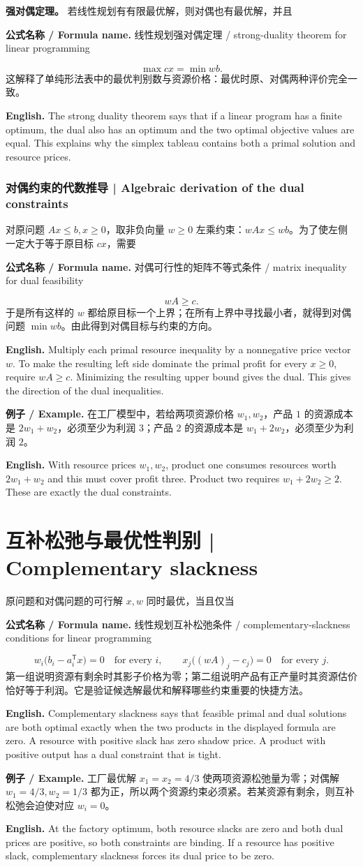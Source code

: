 \documentclass[UTF8,11pt,a4paper]{ctexart}
\newcommand{\EN}[1]{\par\noindent \textbf{English.} #1\par}
\newcommand{\FORMULA}[2]{\par\noindent\textbf{公式名称 / Formula name.} #1 / #2\par}
\newcommand{\EX}[2]{\par\noindent \textbf{例子 / Example.} #1\par\EN{#2}}
\begin{document}
\noindent\textbf{强对偶定理。} 若线性规划有有限最优解，则对偶也有最优解，并且
\FORMULA{线性规划强对偶定理}{strong-duality theorem for linear programming}
\[
\max cx=\min wb.
\]
这解释了单纯形法表中的最优判别数与资源价格：最优时原、对偶两种评价完全一致。
\EN{The strong duality theorem says that if a linear program has a finite optimum, the dual also has an optimum and the two optimal objective values are equal. This explains why the simplex tableau contains both a primal solution and resource prices.}

\subsubsection{对偶约束的代数推导 | Algebraic derivation of the dual constraints}
\noindent 对原问题 $Ax\le b,x\ge0$，取非负向量 $w\ge0$ 左乘约束：$wAx\le wb$。为了使左侧一定大于等于原目标 $cx$，需要
\FORMULA{对偶可行性的矩阵不等式条件}{matrix inequality for dual feasibility}
\[
 wA\ge c.
\]
于是所有这样的 $w$ 都给原目标一个上界；在所有上界中寻找最小者，就得到对偶问题 $\min wb$。由此得到对偶目标与约束的方向。
\EN{Multiply each primal resource inequality by a nonnegative price vector $w$. To make the resulting left side dominate the primal profit for every $x\ge0$, require $wA\ge c$. Minimizing the resulting upper bound gives the dual. This gives the direction of the dual inequalities.}
\EX{在工厂模型中，若给两项资源价格 $w_1,w_2$，产品 $1$ 的资源成本是 $2w_1+w_2$，必须至少为利润 $3$；产品 $2$ 的资源成本是 $w_1+2w_2$，必须至少为利润 $2$。}{With resource prices $w_1,w_2$, product one consumes resources worth $2w_1+w_2$ and this must cover profit three. Product two requires $w_1+2w_2\ge2$. These are exactly the dual constraints.}


\section{互补松弛与最优性判别 | Complementary slackness}
\noindent 原问题和对偶问题的可行解 $x,w$ 同时最优，当且仅当
\FORMULA{线性规划互补松弛条件}{complementary-slackness conditions for linear programming}
\[
w_i\bigl(b_i-a_i^{\mathsf T}x\bigr)=0\quad\text{for every }i,
\qquad
x_j\bigl((wA)_j-c_j\bigr)=0\quad\text{for every }j.
\]
第一组说明资源有剩余时其影子价格为零；第二组说明产品有正产量时其资源估价恰好等于利润。它是验证候选解最优和解释哪些约束重要的快捷方法。
\EN{Complementary slackness says that feasible primal and dual solutions are both optimal exactly when the two products in the displayed formula are zero. A resource with positive slack has zero shadow price. A product with positive output has a dual constraint that is tight.}
\EX{工厂最优解 $x_1=x_2=4/3$ 使两项资源松弛量为零；对偶解 $w_1=4/3,w_2=1/3$ 都为正，所以两个资源约束必须紧。若某资源有剩余，则互补松弛会迫使对应 $w_i=0$。}{At the factory optimum, both resource slacks are zero and both dual prices are positive, so both constraints are binding. If a resource has positive slack, complementary slackness forces its dual price to be zero.}
\end{document}
